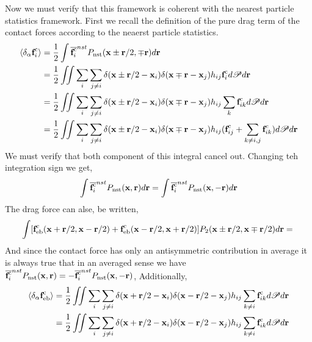 Now we must verify that this framework is coherent with the nearest particle statistics framework.
First we recall the definition of the pure drag term of the contact forces according to the neaerst particle statistics. 
\begin{align*}
    \left<\delta_\alpha \textbf{f}_i^\text{c}\right>
    &= \frac{1}{2}\int \overline{\textbf{f}_i^\text{c}}^{nst} P_\text{nst}(\textbf{x}\pm\textbf{r}/2,\mp \textbf{r}) d\textbf{r}\\
    &=
    \frac{1}{2}\iint \sum_i \sum_{j\neq i}
    \delta(\textbf{x} \pm \textbf{r}/2 -\textbf{x}_i) 
    \delta(\textbf{x} \mp \textbf{r} -\textbf{x}_j) h_{ij}
    \textbf{f}_i^\text{c} 
    d\mathscr{P} d\textbf{r}\\
    &=
    \frac{1}{2}\iint \sum_i \sum_{j\neq i}
    \delta(\textbf{x} \pm \textbf{r}/2 -\textbf{x}_i)
    \delta(\textbf{x} \mp \textbf{r} -\textbf{x}_j) h_{ij}
    \sum_{k} \textbf{f}_{ik}^\text{c} 
    d\mathscr{P} d\textbf{r}\\
    &=
    \frac{1}{2}\iint \sum_i \sum_{j\neq i}
    \delta(\textbf{x} \pm \textbf{r}/2 -\textbf{x}_i)
    \delta(\textbf{x} \mp \textbf{r} -\textbf{x}_j) h_{ij}
     (\textbf{f}_{ij}^\text{c} + \sum_{k\neq i,j} \textbf{f}_{ik}^c)
    d\mathscr{P} d\textbf{r}
\end{align*}
We must verify that both component of this integral cancel out. 
Changing teh integration sign we get,
\begin{equation*}
    \int \overline{\textbf{f}_i^\text{c}}^{nst} P_\text{nst}(\textbf{x}, \textbf{r}) d\textbf{r}
    = \int \overline{\textbf{f}_i^\text{c}}^{nst} P_\text{nst}(\textbf{x}, - \textbf{r}) d\textbf{r}
\end{equation*}
The drag force can alse, be written, 
\begin{equation*}
    \int [\textbf{f}^c_\text{eb}(\textbf{x}+\textbf{r}/2,\textbf{x} - \textbf{r}/2)+ \textbf{f}_\text{eb}^c(\textbf{x} -\textbf{r}/2,\textbf{x}+ \textbf{r}/2)]P_2(\textbf{x}\pm\textbf{r}/2,\textbf{x}\mp \textbf{r}/2) d\textbf{r}
    = \\
\end{equation*}
And since the contact force has only an antisymmetric contribution in average it is always true that in an averaged sense we have $\overline{\textbf{f}_i^\text{c}}^{nst} P_\text{nst}(\textbf{x}, \textbf{r})  = - \overline{\textbf{f}_i^\text{c}}^{nst} P_\text{nst}(\textbf{x}, - \textbf{r}) $, 
Additionally, 
\begin{align*}
    \left<\delta_\alpha \textbf{f}_\text{eb}^\text{c}\right>
    &=
    \frac{1}{2}\iint \sum_i \sum_{j\neq i}
    \delta(\textbf{x} + \textbf{r}/2 -\textbf{x}_i)
    \delta(\textbf{x} - \textbf{r}/2 -\textbf{x}_j) h_{ij}
    \sum_{k \neq i} \textbf{f}_{ik}^\text{c} 
    d\mathscr{P} d\textbf{r}\\
    &=
    \frac{1}{2}\iint \sum_i \sum_{j\neq i}
    \delta(\textbf{x} + \textbf{r}/2 -\textbf{x}_i)
    \delta(\textbf{x} - \textbf{r}/2 -\textbf{x}_j) 
    h_{ij}
    \sum_{k \neq i} \textbf{f}_{ik}^\text{c} 
    d\mathscr{P} d\textbf{r}\\
\end{align*}

